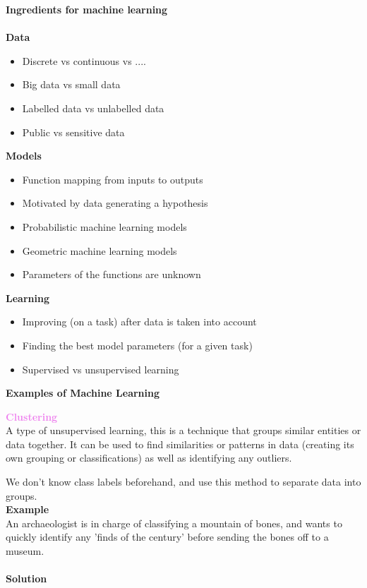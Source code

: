 \documentclass[a4paper,10pt]{article}
\begin{document}
\textcolor{Periwinkle}{\textbf{Ingredients for machine learning}}\\\\
\noindent \textbf{Data}
\begin{itemize}
	\item Discrete vs continuous vs ....
	\item Big data vs small data 
	\item Labelled data vs unlabelled data 
	\item Public vs sensitive data
\end{itemize}
\textbf{Models}
\begin{itemize}
	\item Function mapping from inputs to outputs 
	\item Motivated by data generating a hypothesis 
	\item Probabilistic machine learning models 
	\item Geometric machine learning models 
	\item Parameters of the functions are unknown
\end{itemize}
\textbf{Learning}
\begin{itemize}
	\item Improving (on a task) after data is taken into account
	\item Finding the best model parameters (for a given task)
	\item Supervised vs unsupervised learning 
\end{itemize}
\newpage
\noindent \textcolor{Periwinkle}{\textbf{Examples of Machine Learning}}
\begin{shaded}
\noindent \textcolor{Violet}{\textbf{Clustering}}\\ 
A type of unsupervised learning, this is a technique that groups similar entities or data together. It can be used to find similarities or patterns in data (creating its own grouping or classifications) as well as identifying any outliers.
\end{shaded}
\noindent We don't know class labels beforehand, and use this method to separate data into groups. \\
\noindent \textbf{Example} \\
An archaeologist is in charge of classifying a mountain of bones, and wants to quickly identify any 'finds of the century' before sending the bones off to a museum. \\\\
\noindent \textbf{Solution}\\
\end{document}
